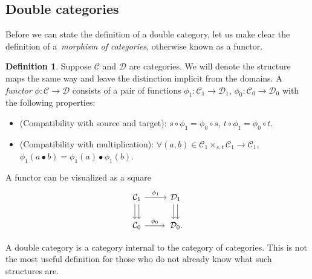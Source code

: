 \documentclass[pdftex]{sigma}
\numberwithin{equation}{section}
\theoremstyle{definition}
\newtheorem{Definition}[Theorem]{Definition}
\newcommand{\CC}{\mathcal{C}}
\renewcommand{\CD}{\mathcal{D}}
\newcommand{\darrow}{\arrow[d, shift right] \arrow[d, shift left]}
\begin{document}
\subsection{Double categories}
Before we can state the definition of a double category, let us make clear the definition of a~\emph{morphism of categories}, otherwise known as a functor.
\begin{Definition}
   Suppose $ \CC $ and $ \CD $ are categories. We will denote the structure maps the same way and leave the distinction implicit from the domains. A \emph{functor} $ \phi \colon \CC \to \CD $ consists of a pair of functions
  $\phi_1 \colon \CC_1 \to \CD_1$, $\phi_0 \colon \CC_0 \to \CD_0$
  with the following properties:
  \begin{itemize}\itemsep=0pt
    \item (Compatibility with source and target):
    $s \circ \phi_1 = \phi_0 \circ s$, $t \circ \phi_1 = \phi_0 \circ t$.
    \item (Compatibility with multiplication):
    $\forall (a,b) \in \CC_1 \times_{s,t} \CC_1 \to \CC_1$, $ \phi_1(a \bullet b) = \phi_1(a) \bullet \phi_1(b) $.
  \end{itemize}
  A functor can be visualized as a square
  \[\begin{tikzcd}
    \CC_1 \darrow \arrow[r, "\phi_1"] & \CD_1 \darrow \\
    \CC_0 \arrow[r, "\phi_0"] &\, \CD_0.
  \end{tikzcd}\]
\end{Definition}
A double category is a category internal to the category of categories. This is not the most useful definition for those who do not already know what such structures are.
\end{document}
